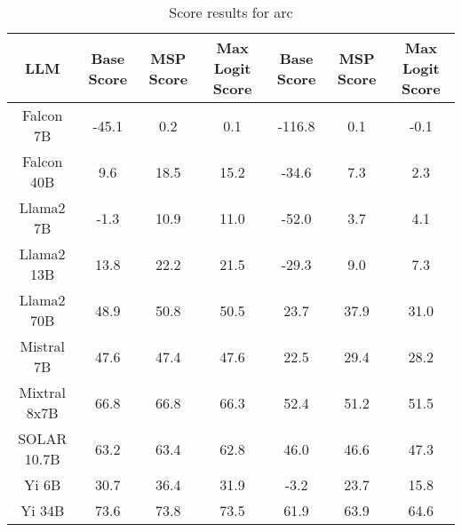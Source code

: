 \renewcommand\arraystretch{1.2}
\begin{table*}
\centering
\begin{tabular}{c|c|c|c|c|c|c}
LLM & Base Score & MSP Score & Max Logit Score & Base Score & MSP Score & Max Logit Score\\ \hline
Falcon 7B & -45.1 & 0.2 & 0.1 & -116.8 & 0.1 & -0.1\\
Falcon 40B & 9.6 & 18.5 & 15.2 & -34.6 & 7.3 & 2.3\\
Llama2 7B & -1.3 & 10.9 & 11.0 & -52.0 & 3.7 & 4.1\\
Llama2 13B & 13.8 & 22.2 & 21.5 & -29.3 & 9.0 & 7.3\\
Llama2 70B & 48.9 & 50.8 & 50.5 & 23.7 & 37.9 & 31.0\\
Mistral 7B & 47.6 & 47.4 & 47.6 & 22.5 & 29.4 & 28.2\\
Mixtral 8x7B & 66.8 & 66.8 & 66.3 & 52.4 & 51.2 & 51.5\\
SOLAR 10.7B & 63.2 & 63.4 & 62.8 & 46.0 & 46.6 & 47.3\\
Yi 6B & 30.7 & 36.4 & 31.9 & -3.2 & 23.7 & 15.8\\
Yi 34B & 73.6 & 73.8 & 73.5 & 61.9 & 63.9 & 64.6\\
\hline
\end{tabular}
\caption{Score results for arc}
\end{table*}
\label{tab:arc_score}
